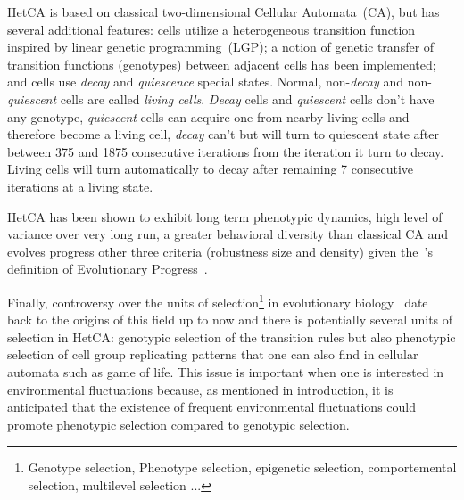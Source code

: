 HetCA is based on classical two-dimensional Cellular Automata~(CA), but has several additional features: cells utilize a heterogeneous transition function inspired by linear genetic programming~(LGP); a notion of genetic transfer of transition functions (genotypes) between adjacent cells has been implemented; and cells use \emph{decay} and \emph{quiescence} special states. Normal, non-\emph{decay} and non-\emph{quiescent} cells are called \emph{living cells}. \emph{Decay} cells and \emph{quiescent} cells don't have any genotype, \emph{quiescent} cells can acquire one from nearby living cells and therefore become a living cell, \emph{decay} can't but will turn to quiescent state after between 375 and 1875 consecutive iterations from the iteration it turn to decay. Living cells will turn automatically to decay after remaining 7 consecutive iterations at a living state. 

HetCA has been shown to exhibit long term phenotypic dynamics, high level of variance over very long run, a greater behavioral diversity than classical CA and evolves progress other three criteria (robustness size and density) given the~\cite{shanahan2012evolutionary}'s definition of Evolutionary Progress~\citep{medernach2015evolutionary}.


Finally, controversy over the units of selection\footnote{Genotype selection, Phenotype selection, epigenetic selection, comportemental selection, multilevel selection \cite{lloyd2012unitsandlevelsofselection}...} in evolutionary biology~\citep{okasha2006evolution} date back to the origins of this field up to now and there is potentially several units of selection in HetCA: genotypic selection of the transition rules but also phenotypic selection of cell group replicating patterns that one can also find in cellular automata such as game of life.  This issue is important when one is interested in environmental fluctuations because, as mentioned in introduction, it is anticipated that the existence of frequent environmental fluctuations could promote phenotypic selection compared to genotypic selection.


